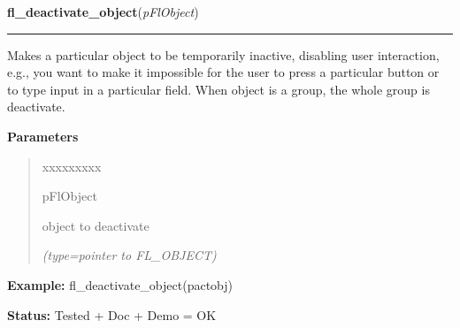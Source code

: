 \hspace{.8\funcindent}\begin{boxedminipage}{\funcwidth}

    \raggedright \textbf{fl\_deactivate\_object}(\textit{pFlObject})

    \vspace{-1.5ex}

    \rule{\textwidth}{0.5\fboxrule}
\setlength{\parskip}{2ex}
    Makes a particular object to be temporarily inactive, disabling user 
    interaction, e.g., you want to make it impossible for the user to press
    a particular button or to type input in a particular field. When object
    is a group, the whole group is deactivate.

\setlength{\parskip}{1ex}
      \textbf{Parameters}
      \vspace{-1ex}

      \begin{quote}
        \begin{Ventry}{xxxxxxxxx}

          \item[pFlObject]

          object to deactivate

            {\it (type=pointer to FL\_OBJECT)}

        \end{Ventry}

      \end{quote}

\textbf{Example:} fl\_deactivate\_object(pactobj)



\textbf{Status:} Tested + Doc + Demo = OK



    \end{boxedminipage}

    \label{xformslib:flbasic:fl_object_is_active}

    \vspace{0.5ex}

